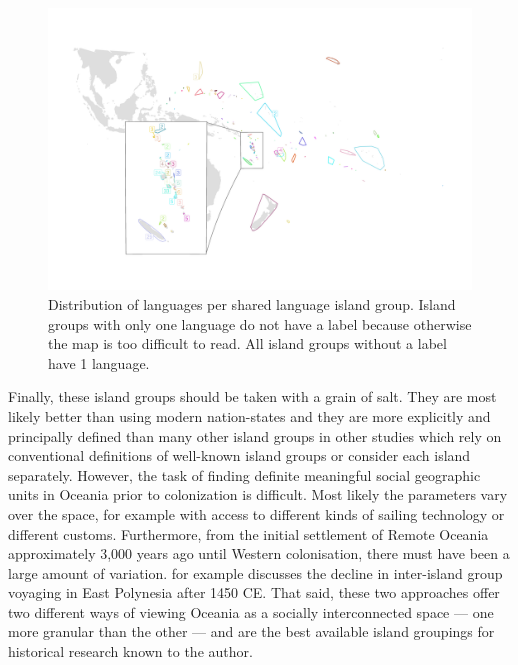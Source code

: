 \documentclass[12pt,letterpaper]{article}
\begin{document}
\begin{figure}
\centering
\includegraphics[width=\textwidth]{polygon_medium_group_map_vanuatu_mh_inset}
\caption{{Distribution of languages per shared language island group. Island groups with only one language do not have a label because otherwise the map is too difficult to read. All island groups without a label have 1 language.}}
\label{appendix_polygon_plot_medium}
\end{figure}

Finally, these island groups should be taken with a grain of salt. They are most likely better than using modern nation-states and they are more explicitly and principally defined than many other island groups in other studies which rely on conventional definitions of well-known island groups or consider each island separately. However, the task of finding definite meaningful social geographic units in Oceania prior to colonization is difficult. Most likely the parameters vary over the space, for example with access to different kinds of sailing technology or different customs. Furthermore, from the initial settlement of Remote Oceania approximately 3,000 years ago until Western colonisation, there must have been a large amount of variation. \citep{rolett2002voyaging} for example discusses the decline in inter-island group voyaging in East Polynesia after 1450 CE. That said, these two approaches offer two different ways of viewing Oceania as a socially interconnected space --- one more granular than the other --- and are the best available island groupings for historical research known to the author.
\end{document}
